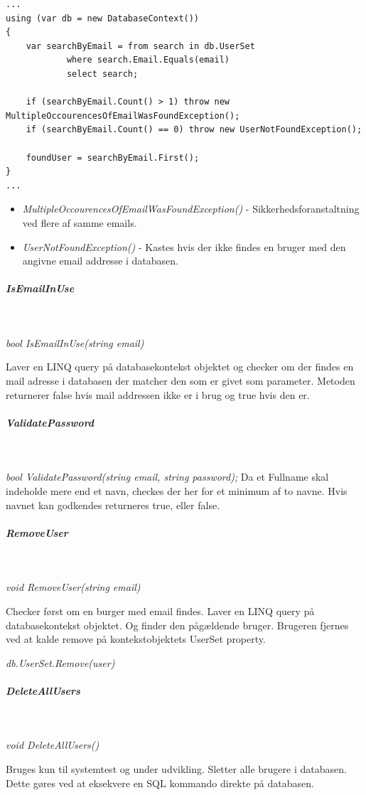 \begin{lstlisting}[caption=Kodeudsnit fra metoden FindUserByEmail, label=code:finduser]
...
using (var db = new DatabaseContext())
{
	var searchByEmail = from search in db.UserSet
			where search.Email.Equals(email)
			select search;

	if (searchByEmail.Count() > 1) throw new    	MultipleOccourencesOfEmailWasFoundException();
	if (searchByEmail.Count() == 0) throw new UserNotFoundException();

	foundUser = searchByEmail.First();
}
...	
\end{lstlisting}

\begin{itemize}
	\item \textit{MultipleOccourencesOfEmailWasFoundException()} - Sikkerhedsforanstaltning ved flere af samme emails.
	\item \textit{UserNotFoundException()} - Kastes hvis der ikke findes en bruger med den angivne email addresse i databasen.
\end{itemize}

\subparagraph{IsEmailInUse}\

\textit{bool IsEmailInUse(string email)}

Laver en LINQ query på databasekontekst objektet og checker om der findes en mail adresse i databasen der matcher den som er givet som parameter. Metoden returnerer false hvis mail addressen ikke er i brug og true hvis den er.

\subparagraph{ValidatePassword}\

\textit{bool ValidatePassword(string email, string password);}
Da et Fullname skal indeholde mere end et navn, checkes der her for et minimum af to navne. Hvis navnet kan godkendes returneres true, eller false.

\subparagraph{RemoveUser}\

\textit{void RemoveUser(string email)}

Checker først om en burger med email findes.
Laver en LINQ query på databasekontekst objektet. Og finder den pågældende bruger.
Brugeren fjernes ved at kalde remove på kontekstobjektets UserSet property.

\textit{db.UserSet.Remove(user)}

\subparagraph{DeleteAllUsers}\

\textit{void DeleteAllUsers()}

Bruges kun til systemtest og under udvikling.
Sletter alle brugere i databasen. Dette gøres ved at eksekvere en SQL kommando direkte på databasen. 


